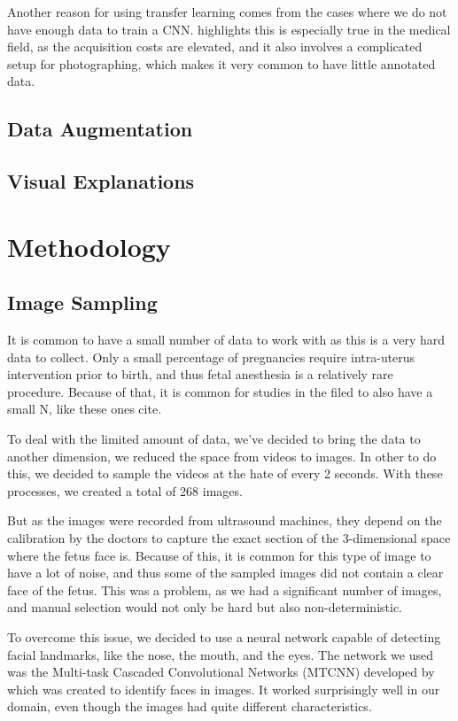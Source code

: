 Another reason for using transfer learning comes from the cases where we do not have enough data to train a CNN. \cite{CelonaBB19} highlights this is especially true in the medical field, as the acquisition costs are elevated, and it also involves a complicated setup for photographing, which makes it very common to have little annotated data.

\subsection{Data Augmentation}

\subsection{Visual Explanations}

\section{Methodology}

\subsection{Image Sampling}

It is common to have a small number of data to work with as this is a very hard data to collect. Only a small percentage of pregnancies require intra-uterus intervention prior to birth, and thus fetal anesthesia is a relatively rare procedure. Because of that, it is common for studies in the filed to also have a small N, like these ones cite{}.

To deal with the limited amount of data, we've decided to bring the data to another dimension, we reduced the space from videos to images. In other to do this, we decided to sample the videos at the hate of every 2 seconds. With these processes, we created a total of 268 images.

But as the images were recorded from ultrasound machines, they depend on the calibration by the doctors to capture the exact section of the 3-dimensional space where the fetus face is. Because of this, it is common for this type of image to have a lot of noise, and thus some of the sampled images did not contain a clear face of the fetus. This was a problem, as we had a significant number of images, and manual selection would not only be hard but also non-deterministic.

To overcome this issue, we decided to use a neural network capable of detecting facial landmarks, like the nose, the mouth, and the eyes. The network we used was the Multi-task Cascaded Convolutional Networks (MTCNN) developed by \cite{ZhangZL016} which was created to identify faces in images. It worked surprisingly well in our domain, even though the images had quite different characteristics.

